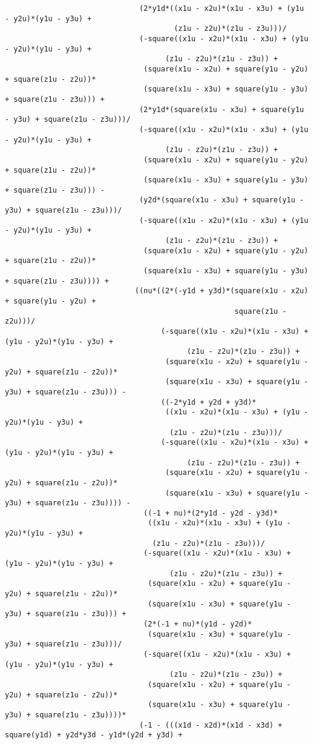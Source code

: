 \begin{lstlisting}
							   (2*y1d*((x1u - x2u)*(x1u - x3u) + (y1u - y2u)*(y1u - y3u) + 
									   (z1u - z2u)*(z1u - z3u)))/
							   (-square((x1u - x2u)*(x1u - x3u) + (y1u - y2u)*(y1u - y3u) + 
									 (z1u - z2u)*(z1u - z3u)) + 
								(square(x1u - x2u) + square(y1u - y2u) + square(z1u - z2u))*
								(square(x1u - x3u) + square(y1u - y3u) + square(z1u - z3u))) + 
							   (2*y1d*(square(x1u - x3u) + square(y1u - y3u) + square(z1u - z3u)))/
							   (-square((x1u - x2u)*(x1u - x3u) + (y1u - y2u)*(y1u - y3u) + 
									 (z1u - z2u)*(z1u - z3u)) + 
								(square(x1u - x2u) + square(y1u - y2u) + square(z1u - z2u))*
								(square(x1u - x3u) + square(y1u - y3u) + square(z1u - z3u))) - 
							   (y2d*(square(x1u - x3u) + square(y1u - y3u) + square(z1u - z3u)))/
							   (-square((x1u - x2u)*(x1u - x3u) + (y1u - y2u)*(y1u - y3u) + 
									 (z1u - z2u)*(z1u - z3u)) + 
								(square(x1u - x2u) + square(y1u - y2u) + square(z1u - z2u))*
								(square(x1u - x3u) + square(y1u - y3u) + square(z1u - z3u)))) + 
							  ((nu*((2*(-y1d + y3d)*(square(x1u - x2u) + square(y1u - y2u) + 
													 square(z1u - z2u)))/
									(-square((x1u - x2u)*(x1u - x3u) + (y1u - y2u)*(y1u - y3u) + 
										  (z1u - z2u)*(z1u - z3u)) + 
									 (square(x1u - x2u) + square(y1u - y2u) + square(z1u - z2u))*
									 (square(x1u - x3u) + square(y1u - y3u) + square(z1u - z3u))) - 
									((-2*y1d + y2d + y3d)*
									 ((x1u - x2u)*(x1u - x3u) + (y1u - y2u)*(y1u - y3u) + 
									  (z1u - z2u)*(z1u - z3u)))/
									(-square((x1u - x2u)*(x1u - x3u) + (y1u - y2u)*(y1u - y3u) + 
										  (z1u - z2u)*(z1u - z3u)) + 
									 (square(x1u - x2u) + square(y1u - y2u) + square(z1u - z2u))*
									 (square(x1u - x3u) + square(y1u - y3u) + square(z1u - z3u)))) - 
								((-1 + nu)*(2*y1d - y2d - y3d)*
								 ((x1u - x2u)*(x1u - x3u) + (y1u - y2u)*(y1u - y3u) + 
								  (z1u - z2u)*(z1u - z3u)))/
								(-square((x1u - x2u)*(x1u - x3u) + (y1u - y2u)*(y1u - y3u) + 
									  (z1u - z2u)*(z1u - z3u)) + 
								 (square(x1u - x2u) + square(y1u - y2u) + square(z1u - z2u))*
								 (square(x1u - x3u) + square(y1u - y3u) + square(z1u - z3u))) + 
								(2*(-1 + nu)*(y1d - y2d)*
								 (square(x1u - x3u) + square(y1u - y3u) + square(z1u - z3u)))/
								(-square((x1u - x2u)*(x1u - x3u) + (y1u - y2u)*(y1u - y3u) + 
									  (z1u - z2u)*(z1u - z3u)) + 
								 (square(x1u - x2u) + square(y1u - y2u) + square(z1u - z2u))*
								 (square(x1u - x3u) + square(y1u - y3u) + square(z1u - z3u))))*
							   (-1 - (((x1d - x2d)*(x1d - x3d) + square(y1d) + y2d*y3d - y1d*(y2d + y3d) + 

\end{lstlisting}
